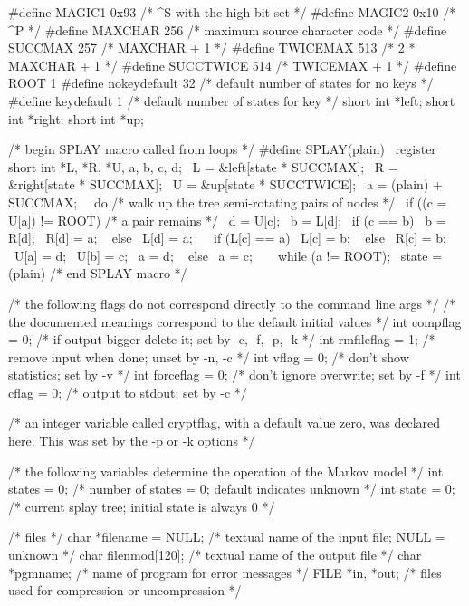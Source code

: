 #define MAGIC1 0x93	/* ^S with the high bit set */
#define MAGIC2 0x10	/* ^P */
#define MAXCHAR	256	/* maximum source character code */
#define SUCCMAX	257	/* MAXCHAR + 1 */
#define TWICEMAX 513	/* 2 * MAXCHAR + 1 */
#define SUCCTWICE 514	/* TWICEMAX + 1 */
#define ROOT	1
#define nokeydefault 32	/* default number of states for no keys */
#define keydefault 1	/* default number of states for key */
short int *left;
short int *right;
short int *up;

/* begin SPLAY macro called from loops */
#define SPLAY(plain) {							\
	register short int *L, *R, *U, a, b, c, d;			\
	L = &left[state * SUCCMAX];					\
	R = &right[state * SUCCMAX];					\
	U = &up[state * SUCCTWICE];					\
	a = (plain) + SUCCMAX;						\
									\
	do { 	/* walk up the tree semi-rotating pairs of nodes */	\
		if ((c = U[a]) != ROOT) { 	/* a pair remains */	\
			d = U[c];					\
			b = L[d];					\
			if (c == b) {					\
				b = R[d];				\
				R[d] = a;				\
			} else {					\
				L[d] = a;				\
			}						\
			if (L[c] == a) {				\
				L[c] = b;				\
			} else { 					\
				R[c] = b;				\
			}						\
			U[a] = d;					\
			U[b] = c;					\
			a = d;						\
		} else { 						\
			a = c;						\
		}							\
	} while (a != ROOT);						\
	state = (plain) %
}
/* end SPLAY macro */

/* the following flags do not correspond directly to the command line args */
/* the documented meanings correspond to the default initial values */
int compflag = 0;	/* if output bigger delete it; set by -c, -f, -p, -k */
int rmfileflag = 1;	/* remove input when done; unset by -n, -c */
int vflag = 0;		/* don't show statistics; set by -v */
int forceflag = 0;	/* don't ignore overwrite; set by -f */
int cflag = 0;		/* output to stdout; set by -c */

/* an integer variable called cryptflag, with a default value zero, was
   declared here.  This was set by the -p or -k options */

/* the following variables determine the operation of the Markov model */
int states = 0;		/* number of states = 0; default indicates unknown */
int state = 0;		/* current splay tree; initial state is always 0 */

/* files */
char *filename = NULL;	/* textual name of the input file; NULL = unknown */
char filenmod[120];	/* textual name of the output file */
char *pgmname;		/* name of program for error messages */
FILE *in, *out;		/* files used for compression or uncompression */

